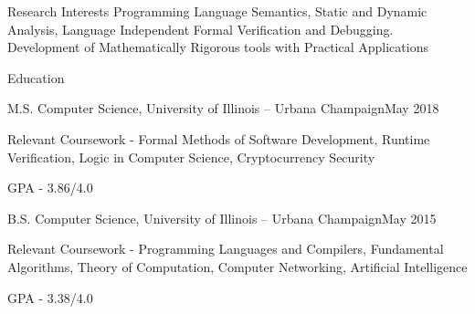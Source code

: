 \documentclass{resume} %
\begin{document}
 
 \begin{rSection}{Research Interests}
  Programming Language Semantics, Static and Dynamic Analysis, Language Independent Formal Verification and Debugging.
  Development of Mathematically Rigorous tools with Practical Applications
 \end{rSection}
\begin{rSection}{Education}
\begin{rSubsection}{ M.S. Computer Science, University of Illinois -- Urbana Champaign}{May 2018}{}{}
\item Relevant Coursework - Formal Methods of Software Development, Runtime Verification, Logic in Computer Science, Cryptocurrency Security 
\item GPA - 3.86/4.0
\end{rSubsection}
\begin{rSubsection}{ B.S. Computer Science, University of Illinois -- Urbana Champaign}{May 2015}{}{}
\item Relevant Coursework - Programming Languages and Compilers, Fundamental Algorithms, Theory of Computation, Computer Networking, Artificial Intelligence
\item GPA - 3.38/4.0
\end{rSubsection}
\end{rSection}
\end{document}
